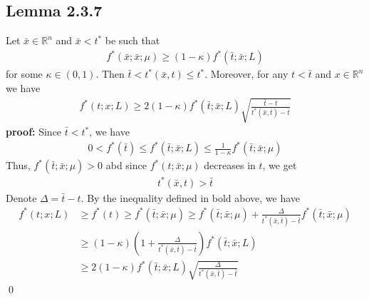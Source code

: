 \documentclass[12pt,a4paper]{article}
\begin{document}
	\subsection*{Lemma 2.3.7}\label{lem237}
	Let $\bar{x}\in \mathbb{R}^n$ and $\bar{x}< t^*$ be such that
	\begin{align*}
		f^*(\bar{x};\bar{x};\mu) \geq (1 - \kappa)f^*(\bar{t};\bar{x};L)
	\end{align*}
	for some $\kappa \in (0,1)$. Then $\bar{t}<t^*(\bar{x},t) \leq t^*$. Moreover, for any $t < \bar{t}$ and $x \in \mathbb{R}^n$ we have
	\begin{align*}
		f^*(t;x;L) \geq 2(1 - \kappa)f^*(\bar{t};\bar{x};L)\sqrt{\frac{\bar{t} - t}{t^*(\bar{x},\bar{t}) - \bar{t}}}
	\end{align*}
	\textbf{proof:} Since $\bar{t} < t^*$, we have
	\begin{align*}
		0 < f^*(\bar{t}) \leq f^*(\bar{t};\bar{x};L) \leq \frac{1}{1 - \kappa}f^*(\bar{t};\bar{x};\mu)
	\end{align*}
	Thus, $f^*(\bar{t};\bar{x};\mu) > 0$ abd since $f^*(t;\bar{x};\mu)$ decreases in $t$, we get 
	\begin{align*}
		t^*(\bar{x},t) > \bar{t}
	\end{align*}
	Denote $\Delta = \bar{t} - t$. By the inequality defined in bold above, we have
	\begin{align*}
		f^*(t;x;L) &\geq f^*(t) \geq f^*(\bar{t};\bar{x};\mu) \geq f^*(\bar{t};\bar{x};\mu) + \frac{\Delta}{t^*(\bar{x},\bar{t}) - \bar{t}}f^*(\bar{t};\bar{x};\mu) \\
		&\geq (1 - \kappa)(1 + \frac{\Delta}{t^*(\bar{x},\bar{t}) - \bar{t}})f^*(\bar{t};\bar{x};L) \\
		&\geq 2(1 - \kappa)f^*(\bar{t};\bar{x};L)\sqrt{\frac{\Delta}{t^*(\bar{x},\bar{t}) - \bar{t}}}
	\end{align*}
	\qed 
\end{document}
